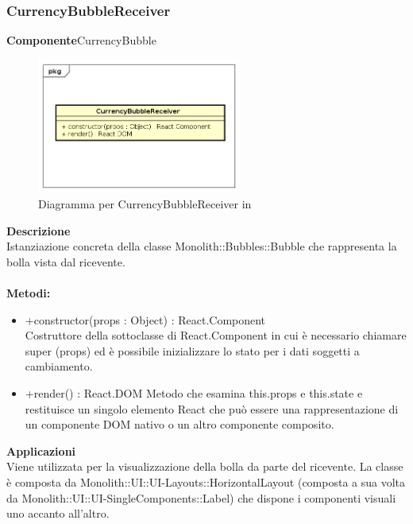 \clearpage

\subsubsection{CurrencyBubbleReceiver}
\textbf{Componente}CurrencyBubble\\
   \FloatBarrier
   \begin{figure}[ht]
   \centering
   \includegraphics[width=0.6\textwidth]{img/single-CurrencyBubbleReceiver}
   \caption{{Diagramma per CurrencyBubbleReceiver in }}
\end{figure}
\FloatBarrier
\textbf{Descrizione}\\
Istanziazione concreta della classe Monolith::Bubbles::Bubble che rappresenta la bolla vista dal ricevente.
\\
\\
\textbf{Metodi:} 
\begin{itemize}
\item +constructor(props : Object) : React.Component 
\\
Costruttore della sottoclasse di React.Component in cui è necessario chiamare super (props) ed è possibile inizializzare lo stato per i dati soggetti a cambiamento.

\item +render() : React.DOM
Metodo che esamina this.props e this.state e restituisce un singolo elemento React che può essere una rappresentazione di un componente DOM nativo o un altro componente composito.

\end{itemize} 


\textbf{Applicazioni}\\
Viene utilizzata per la visualizzazione della bolla da parte del ricevente.
La classe è composta da Monolith::UI::UI-Layouts::HorizontalLayout (composta a sua volta da Monolith::UI::UI-SingleComponents::Label) che dispone i componenti visuali uno accanto all'altro. 


\clearpage

